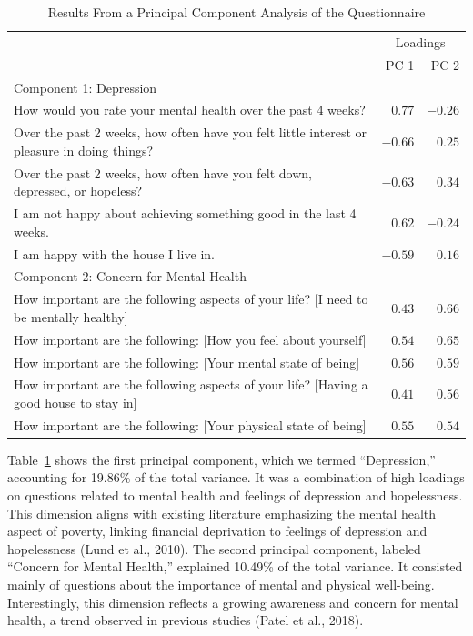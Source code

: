 \documentclass[
]{report}
\begin{document}
\hypertarget{tbl-pilot-pca}{}
\begin{longtable}{lrr}
\caption{\label{tbl-pilot-pca}Results From a Principal Component Analysis of the Questionnaire }\tabularnewline

\toprule
 & \multicolumn{2}{c}{Loadings} \\ 
\cmidrule(lr){2-3}
 & PC 1 & PC 2 \\ 
\midrule
\multicolumn{3}{l}{Component 1: Depression} \\ 
\midrule
How would you rate your mental health over the past 4 weeks? & $0.77$ & $-0.26$ \\ 
Over the past 2 weeks, how often have you felt little interest or pleasure in doing things? & $-0.66$ & $0.25$ \\ 
Over the past 2 weeks, how often have you felt down, depressed, or hopeless? & $-0.63$ & $0.34$ \\ 
I am not happy about achieving something good in the last 4 weeks. & $0.62$ & $-0.24$ \\ 
I am happy with the house I live in. & $-0.59$ & $0.16$ \\ 
\midrule
\multicolumn{3}{l}{Component 2: Concern for Mental Health} \\ 
\midrule
How important are the following aspects of your life? [I need to be mentally healthy] & $0.43$ & $0.66$ \\ 
How important are the following: [How you feel about yourself] & $0.54$ & $0.65$ \\ 
How important are the following: [Your mental state of being] & $0.56$ & $0.59$ \\ 
How important are the following aspects of your life? [Having a good house to stay in] & $0.41$ & $0.56$ \\ 
How important are the following: [Your physical state of being] & $0.55$ & $0.54$ \\ 
\bottomrule
\end{longtable}

Table~\ref{tbl-pilot-pca} shows the first principal component, which we
termed ``Depression,'' accounting for 19.86\% of the total variance. It
was a combination of high loadings on questions related to mental health
and feelings of depression and hopelessness. This dimension aligns with
existing literature emphasizing the mental health aspect of poverty,
linking financial deprivation to feelings of depression and hopelessness
(Lund et al., 2010). The second principal component, labeled ``Concern
for Mental Health,'' explained 10.49\% of the total variance. It
consisted mainly of questions about the importance of mental and
physical well-being. Interestingly, this dimension reflects a growing
awareness and concern for mental health, a trend observed in previous
studies (Patel et al., 2018).
\end{document}
